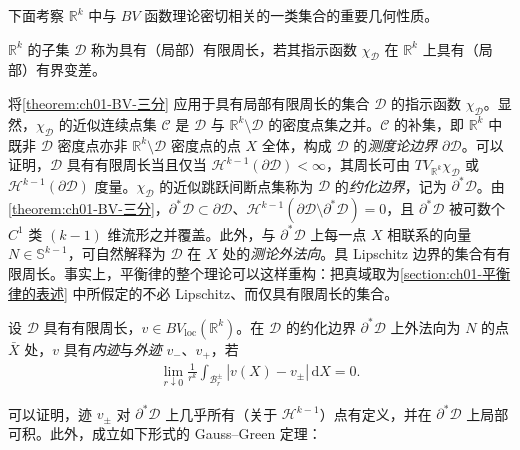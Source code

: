 \documentclass[../../main.tex]{subfiles}
\begin{document}
下面考察 $\mathbb{R}^{k}$ 中与 $BV$ 函数理论密切相关的一类集合的重要几何性质。

\begin{definition}\label{definition:ch01-有限周长}
$\mathbb{R}^{k}$ 的子集 $\mathscr{D}$ 称为具有（局部）有限周长，若其指示函数 $\chi_{\mathscr{D}}$ 在 $\mathbb{R}^{k}$ 上具有（局部）有界变差。
\end{definition}

将\cref{theorem:ch01-BV-三分} 应用于具有局部有限周长的集合 $\mathscr{D}$ 的指示函数 $\chi_{\mathscr{D}}$。显然，$\chi_{\mathscr{D}}$ 的近似连续点集 $\mathscr{C}$ 是 $\mathscr{D}$ 与 $\mathbb{R}^{k}\setminus\mathscr{D}$ 的密度点集之并。$\mathscr{C}$ 的补集，即 $\mathbb{R}^{k}$ 中既非 $\mathscr{D}$ 密度点亦非 $\mathbb{R}^{k}\setminus\mathscr{D}$ 密度点的点 $X$ 全体，构成 $\mathscr{D}$ 的\emph{测度论边界} $\partial\mathscr{D}$。可以证明，$\mathscr{D}$ 具有有限周长当且仅当 $\mathscr{H}^{k-1}(\partial\mathscr{D})<\infty$，其周长可由 $TV_{\mathbb{R}^{k}}\chi_{\mathscr{D}}$ 或 $\mathscr{H}^{k-1}(\partial\mathscr{D})$ 度量。$\chi_{\mathscr{D}}$ 的近似跳跃间断点集称为 $\mathscr{D}$ 的\emph{约化边界}，记为 $\partial^{*}\mathscr{D}$。由\cref{theorem:ch01-BV-三分}，$\partial^{*}\mathscr{D}\subset\partial\mathscr{D}$、$\mathscr{H}^{k-1}(\partial\mathscr{D}\setminus\partial^{*}\mathscr{D})=0$，且 $\partial^{*}\mathscr{D}$ 被可数个 $C^{1}$ 类 $(k-1)$ 维流形之并覆盖。此外，与 $\partial^{*}\mathscr{D}$ 上每一点 $X$ 相联系的向量 $N\in\mathbb{S}^{k-1}$，可自然解释为 $\mathscr{D}$ 在 $X$ 处的\emph{测论外法向}。具 Lipschitz 边界的集合有有限周长。事实上，平衡律的整个理论可以这样重构：把真域取为\cref{section:ch01-平衡律的表述} 中所假定的不必 Lipschitz、而仅具有限周长的集合。

\begin{definition}\label{definition:ch01-迹}
设 $\mathscr{D}$ 具有有限周长，$v\in BV_{\mathrm{loc}}(\mathbb{R}^{k})$。在 $\mathscr{D}$ 的约化边界 $\partial^{*}\mathscr{D}$ 上外法向为 $N$ 的点 $\bar{X}$ 处，$v$ 具有\emph{内迹}与\emph{外迹} $v_{-}$、$v_{+}$，若
\begin{align}
\lim_{r\downarrow 0}\frac{1}{r^{k}}\int_{\mathscr{B}_{r}^{\pm}}|v(X)-v_{\pm}|\,\mathrm{d}X=0.\label{align:ch01-trace-def}
\end{align}
\end{definition}

可以证明，迹 $v_{\pm}$ 对 $\partial^{*}\mathscr{D}$ 上几乎所有（关于 $\mathscr{H}^{k-1}$）点有定义，并在 $\partial^{*}\mathscr{D}$ 上局部可积。此外，成立如下形式的 Gauss--Green 定理：
\end{document}
